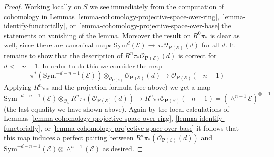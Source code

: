 \begin{proof}
\medskip\noindent
Working locally on $S$ we see immediately from the computation of
cohomology in Lemmas \ref{lemma-cohomology-projective-space-over-ring},
\ref{lemma-identify-functorially}, or
\ref{lemma-cohomology-projective-space-over-base} the statements on
vanishing of the lemma. Moreover the result on $R^0\pi_*$ is clear
as well, since there are canonical maps
$\text{Sym}^d(\mathcal{E}) \to \pi_* \mathcal{O}_{\mathbf{P}(\mathcal{E})}(d)$
for all $d$. It remains to show that the description of
$R^n\pi_*\mathcal{O}_{\mathbf{P}(\mathcal{E})}(d)$ is correct
for $d < -n - 1$. In order to do this we consider the map
$$
\pi^*(\text{Sym}^{-d - n - 1}(\mathcal{E}))
\otimes_{\mathcal{O}_{\mathbf{P}(\mathcal{E})}}
\mathcal{O}_{\mathbf{P}(\mathcal{E})}(d)
\longrightarrow
\mathcal{O}_{\mathbf{P}(\mathcal{E})}(-n - 1)
$$
Applying $R^n\pi_*$ and the projection formula (see above) we get a map
$$
\text{Sym}^{-d - n - 1}(\mathcal{E})
\otimes_{\mathcal{O}_S}
R^n\pi_*(\mathcal{O}_{\mathbf{P}(\mathcal{E})}(d))
\longrightarrow
R^n\pi_*\mathcal{O}_{\mathbf{P}(\mathcal{E})}(-n - 1) =
(\wedge^{n + 1}\mathcal{E})^{\otimes -1}
$$
(the last equality we have shown above).
Again by the local calculations of Lemmas
\ref{lemma-cohomology-projective-space-over-ring},
\ref{lemma-identify-functorially}, or
\ref{lemma-cohomology-projective-space-over-base}
it follows that this map induces a perfect pairing between
$R^n\pi_*(\mathcal{O}_{\mathbf{P}(\mathcal{E})}(d))$ and
$\text{Sym}^{-d - n - 1}(\mathcal{E}) \otimes \wedge^{n + 1}(\mathcal{E})$
as desired.
\end{proof}
